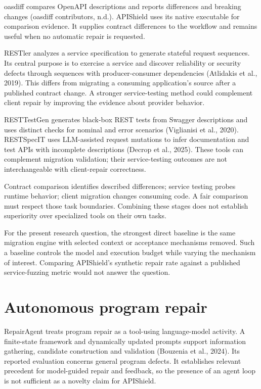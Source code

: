 \documentclass[12pt,a4paper,oneside]{report}
\begin{document}
oasdiff compares OpenAPI descriptions and reports differences and breaking changes (oasdiff contributors, n.d.). APIShield uses its native executable for comparison evidence. It supplies contract differences to the workflow and remains useful when no automatic repair is requested.

RESTler analyzes a service specification to generate stateful request sequences. Its central purpose is to exercise a service and discover reliability or security defects through sequences with producer-consumer dependencies (Atlidakis et al., 2019). This differs from migrating a consuming application's source after a published contract change. A stronger service-testing method could complement client repair by improving the evidence about provider behavior.

RESTTestGen generates black-box REST tests from Swagger descriptions and uses distinct checks for nominal and error scenarios (Viglianisi et al., 2020). RESTSpecIT uses LLM-assisted request mutations to infer documentation and test APIs with incomplete descriptions (Decrop et al., 2025). These tools can complement migration validation; their service-testing outcomes are not interchangeable with client-repair correctness.

Contract comparison identifies described differences; service testing probes runtime behavior; client migration changes consuming code. A fair comparison must respect those task boundaries. Combining these stages does not establish superiority over specialized tools on their own tasks.

For the present research question, the strongest direct baseline is the same migration engine with selected context or acceptance mechanisms removed. Such a baseline controls the model and execution budget while varying the mechanism of interest. Comparing APIShield's synthetic repair rate against a published service-fuzzing metric would not answer the question.

\section{Autonomous program repair}

RepairAgent treats program repair as a tool-using language-model activity. A finite-state framework and dynamically updated prompts support information gathering, candidate construction and validation (Bouzenia et al., 2024). Its reported evaluation concerns general program defects. It establishes relevant precedent for model-guided repair and feedback, so the presence of an agent loop is not sufficient as a novelty claim for APIShield.
\end{document}
